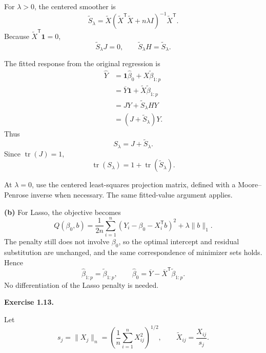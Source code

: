 \documentclass[answers,12pt,addpoints]{exam}
\providecommand{\trans}{^{\mathsf T}}
\providecommand{\ones}{\mathbf{1}}
\providecommand{\tr}{\operatorname{tr}}
\begin{document}
\begin{questions}
\begin{solution}
For $\lambda>0$, the centered smoother is
\[
\widetilde S_\lambda
=
\widetilde X
(\widetilde X\trans\widetilde X+n\lambda I)^{-1}
\widetilde X\trans.
\]
Because $\widetilde X\trans\ones=0$,
\[
\widetilde S_\lambda J=0,
\qquad
\widetilde S_\lambda H=\widetilde S_\lambda.
\]

The fitted response from the original regression is
\begin{align*}
\widehat Y
&=
\ones\widehat\beta_0+X\widetilde\beta_{1:p}\\
&=
\overline Y\ones+\widetilde X\widetilde\beta_{1:p}\\
&=
JY+\widetilde S_\lambda HY\\
&=
(J+\widetilde S_\lambda)Y.
\end{align*}
Thus
\[
S_\lambda=J+\widetilde S_\lambda.
\]
Since $\tr(J)=1$,
\[
\boxed{
\tr(S_\lambda)=1+\tr(\widetilde S_\lambda).
}
\]

At $\lambda=0$, use the centered least-squares projection matrix,
defined with a Moore--Penrose inverse when necessary.
The same fitted-value argument applies.

\textbf{(b)}
For Lasso, the objective becomes
\[
Q(\beta_0,b)
=
\frac{1}{2n}
\sum_{i=1}^n
(Y_i-\beta_0-X_i\trans b)^2
+
\lambda\|b\|_1.
\]
The penalty still does not involve $\beta_0$, so the optimal
intercept and residual substitution are unchanged, and the same
correspondence of minimizer sets holds. Hence
\[
\boxed{
\widehat\beta_{1:p}=\widetilde\beta_{1:p},
\qquad
\widehat\beta_0
=
\overline Y-\overline X\trans\widetilde\beta_{1:p}.
}
\]
No differentiation of the Lasso penalty is needed.

\end{solution}

\question \textbf{Exercise 1.13.}

Let
\[
s_j=\|X_j\|_n
=
\left(\frac1n\sum_{i=1}^nX_{ij}^2\right)^{1/2},
\qquad
\widetilde X_{ij}=\frac{X_{ij}}{s_j}.
\]

\end{questions}
\end{document}
